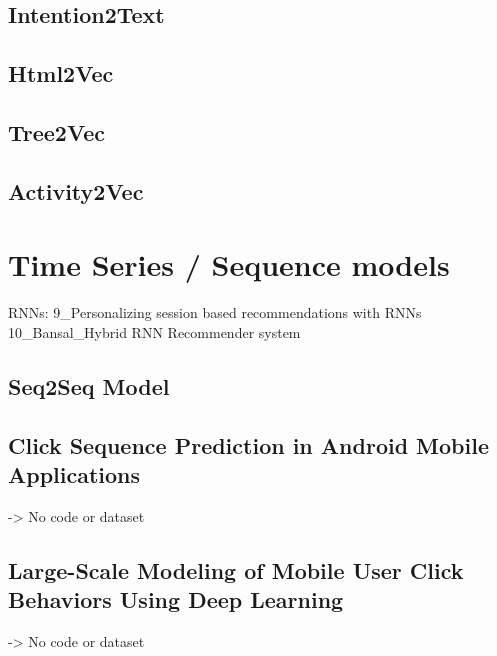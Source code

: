 \subsection{Intention2Text}
\cite{yu2020understanding}

\subsection{Html2Vec}
\cite{wu2022distributed}

\subsection{Tree2Vec}

\subsection{Activity2Vec}


\section{Time Series / Sequence models}

RNNs: 9_Personalizing session based recommendations with RNNs \cite{quadrana2017personalizing}
10_Bansal_Hybrid RNN Recommender system \cite{bansal2022remembering}
\cite{pietro2022recommendationSystems}

\subsection{Seq2Seq Model}
\cite{chollet2017seq2seq}

\subsection{Click Sequence Prediction in Android Mobile Applications}
\cite{lee2018click}
-> No code or dataset

\subsection{Large-Scale Modeling of Mobile User Click Behaviors Using Deep Learning}
\cite{zhou2021large}
-> No code or dataset

